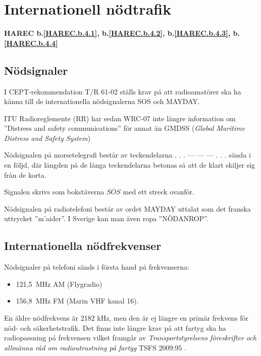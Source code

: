 \section{Internationell nödtrafik}
\textbf{
	HAREC b.\ref{HAREC.b.4.1}\label{myHAREC.b.4.1},
	b.\ref{HAREC.b.4.2}\label{myHAREC.b.4.2},
	b.\ref{HAREC.b.4.3}\label{myHAREC.b.4.3},
	b.\ref{HAREC.b.4.4}\label{myHAREC.b.4.4}
}

\subsection{Nödsignaler}

I CEPT-rekommendation T/R 61-02 \cite{TR6102} ställs krav på att radioamatörer
ska ha känna till de internationella nödsignalerna SOS och MAYDAY.

ITU Radioreglemente (RR) \cite{ITU-RR} har sedan WRC-07 inte längre information
om ''Distress and safety communications'' för annat än
GMDSS (\emph{Global Maritime Distress and Safety System})

Nödsignalen på morsetelegrafi består av teckendelarna . . . --- --- --- . . .
sända i en följd, där längden på de långa teckendelarna betonas så att de klart
skiljer sig från de korta.

Signalen skrivs som bokstäverna $\overline{SOS}$ med ett streck ovanför.

Nödsignalen på radiotelefoni består av ordet MAYDAY uttalat som det franska
uttrycket ''m'aider''. I Sverige kan man även ropa ''NÖDANROP''.

\subsection{Internationella nödfrekvenser}

Nödsignaler på telefoni sänds i första hand på frekvenserna:
\begin{itemize}
	\item 121,5~MHz AM (Flygradio)
	\item 156,8~MHz FM (Marin VHF kanal 16).
\end{itemize}

En äldre nödfrekvens är 2182 kHz, men den är ej längre en primär frekvens för
nöd- och säkerhetstrafik.
Det finns inte längre krav på att fartyg ska ha radiopassning på frekvensen
vilket framgår av \emph{Transportstyrelsens föreskrifter och allmänna råd
	om radioutrustning på fartyg} TSFS 2009:95 \cite[\S22]{TSFS2009:95}.

